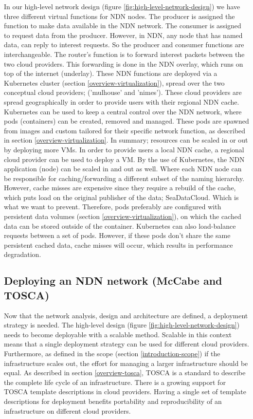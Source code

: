 In our high-level network design (figure \ref{fig:high-level-network-design}) we have three different virtual functions for NDN nodes. The producer is assigned the function to make data available in the NDN network. The consumer is assigned to request data from the producer. However, in NDN, any node that has named data, can reply to interest requests. So the producer and consumer functions are interchangeable. The router's function is to forward interest packets between the two cloud providers. This forwarding is done in the NDN overlay, which runs on top of the internet (underlay). These NDN functions are deployed via a Kubernetes cluster (section \ref{overview-virtualization}), spread over the two conceptual cloud providers; ('mulhouse' and 'nimes'). These cloud providers are spread geographically in order to provide users with their regional NDN cache. Kubernetes can be used to keep a central control over the NDN network, where pods (containers) can be created, removed and managed. These pods are spawned from images and custom tailored for their specific network function, as described in section \ref{overview-virtualization}. In summary; resources can be scaled in or out by deploying more VMs. In order to provide users a local NDN cache, a regional cloud provider can be used to deploy a VM. By the use of Kubernetes, the NDN application (node) can be scaled in and out as well. Where each NDN node can be responsible for caching/forwarding a different subset of the naming hierarchy. However, cache misses are expensive since they require a rebuild of the cache, which puts load on the original publisher of the data; SeaDataCloud. Which is what we want to prevent. Therefore, pods preferably are configured with persistent data volumes (section \ref{overview-virtualization}), on which the cached data can be stored outside of the container. Kubernetes can also load-balance requests between a set of pods. However, if these pods don't share the same persistent cached data, cache misses will occur, which results in performance degradation.

\subsection{Deploying an NDN network (McCabe and TOSCA)}
\label{planning-deploying}
Now that the network analysis, design and architecture are defined, a deployment strategy is needed. The high-level design (figure \ref{fig:high-level-network-design}) needs to become deployable with a scalable method. Scalable in this context means that a single deployment strategy can be used for different cloud providers. Furthermore, as defined in the scope (section \ref{introduction-scope}) if the infrastructure scales out, the effort for managing a larger infrastructure should be equal. As described in section \ref{overview-tosca}, TOSCA is a standard to describe the complete life cycle of an infrastructure. There is a growing support for TOSCA template descriptions in cloud providers. Having a single set of template descriptions for deployment benefits portability and reproducibility of an infrastructure on different cloud providers.

